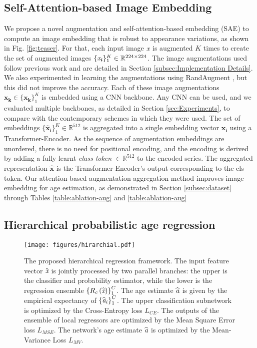 \documentclass[10pt,journal]{IEEEtran}\usepackage{amsfonts}
\begin{document}
\subsection{Self-Attention-based Image Embedding}

\label{subsec:self-atten}

We propose a novel augmentation and self-attention-based embedding (SAE) to
compute an image embedding that is robust to appearance variations, as shown
in Fig. \ref{fig:teaser}. For that, each input image $\emph{x}$ is augmented
$K$ times to create the set of augmented images $\{\emph{x}\boldsymbol{_{i}}\}_{1}^{K}\in\mathbb{R}^{224\times224}$. The image augmentations used follow
previous work and are detailed in Section \ref{subsec:Implementation Details}.
We also experimented in learning the augmentations using RandAugment
\cite{Randaugment}, but this did not improve the accuracy. Each of these image
augmentations $\mathbf{x_{k}}\in\{\mathbf{x_{k}}\}_{1}^{K}$ is embedded using
a CNN backbone. Any CNN can be used, and we evaluated multiple backbones, as
detailed in Section \ref{sec:Experiments}, to compare with the contemporary
schemes in which they were used. The set of embeddings $\mathbf{\{\hat{x}_{i}\}}_{1}^{K}\in\mathbb{R}^{512}$ is aggregated into a single embedding
vector $\mathbf{\hat{x}_{i}}$ using a Transformer-Encoder. As the sequence of
augmentation embeddings are unordered, there is no need for positional
encoding, and the encoding is derived by adding a fully learnt \textit{class
token} $\in\mathbb{R}^{512}$ to the encoded series. The aggregated
representation $\mathbf{\hat{x}}$ is the Transformer-Encoder's output
corresponding to the cls token. Our attention-based augmentation-aggregation
method improves image embedding for age estimation, as demonstrated in Section
\ref{subsec:dataset} through Tables \ref{table:ablation-aug} and
\ref{table:ablation-aug}

\subsection{Hierarchical probabilistic age regression}

\label{subsec:regression} \begin{figure*}[tbh]
\begin{center}
\centering\texttt{[image: figures/hirarchial.pdf]}
\end{center}
\caption{The proposed hierarchical regression framework. The input feature
vector $\hat{\emph{x}}$ is jointly processed by two parallel branches: the
upper is the classifier and probability estimator, while the lower is the
regression ensemble $\left\{  R_{c}\left(  \widehat{\emph{x}}\right)
\right\}  _{1}^{C}$. The age estimate $\widehat{\emph{a}}$ is given by the
empirical expectancy of $\left\{  \widehat{\emph{a}}_{i}\right\}  _{1}^{C}$.
The upper classification subnetwork is optimized by the Cross-Entropy loss
$L_{CE}$. The outputs of the ensemble of local regressors are optimized by the
Mean Square Error loss $L_{MSE}$. The network's age estimate $\widehat
{\emph{a}}$ is optimized by the Mean-Variance Loss \cite{Mean-Variance}
$L_{MV}$. }\label{fig:hierarichal}\end{figure*}
\end{document}
